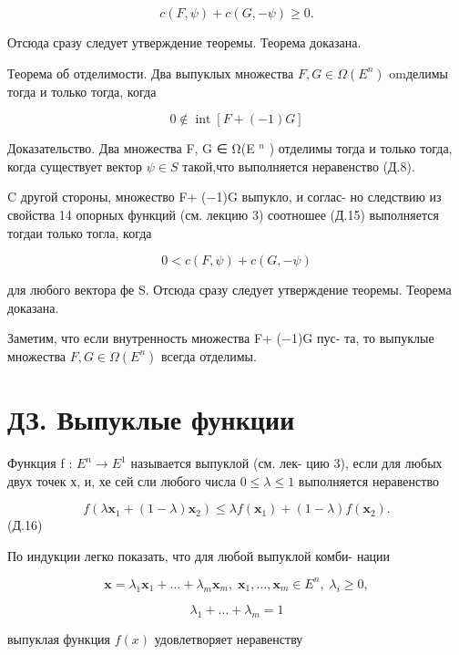 \documentclass[8pt]{extarticle}
\begin{document}
\[
c\left( {F,\psi }\right)  + c\left( {G, - \psi }\right)  \geq  0.
\]

Отсюда сразу следует утверждение теоремы. Теорема доказана.

Теорема об отделимости. Два выпуклых множества \(F,G \in  \Omega \left( {E}^{n}\right)\) omделимы тогда и только тогда, когда

\[
0 \notin  \operatorname{int}\left\lbrack  {F + \left( {-1}\right) G}\right\rbrack \tag{II.15}
\]

Доказательство. Два множества F, G ∈ Ω(E \({}^{n}\) ) отделимы тогда и только тогда, когда существует вектор \(\psi  \in  S\) такой,что выполняется неравенство (Д.8).

C другой стороны, множество F+ (−1)G выпукло, и соглас- но следствию из свойства 14 опорных функций (см. лекцию 3) соотношее (Д.15) выполняется тогдаи только тогла, когда

\[
0 < c\left( {F,\psi }\right)  + c\left( {G, - \psi }\right)
\]

для любого вектора фе S. Отсюда сразу следует утверждение теоремы. Теорема доказана.

Заметим, что если внутренность множества F+ (−1)G пус- та, то выпуклые множества \(F,G \in  \Omega \left( {E}^{n}\right)\) всегда отделимы.

\section*{ДЗ. Выпуклые функции}

Функция f : \({E}^{n} \rightarrow  {E}^{1}\) называется выпуклой (см. лек- цию 3), если для любых двух точек х, и, хе сей сли любого числа \(0 \leq  \lambda  \leq  1\) выполняется неравенство

\[
f\left( {\lambda {\mathbf{x}}_{1} + \left( {1 - \lambda }\right) {\mathbf{x}}_{2}}\right)  \leq  {\lambda f}\left( {\mathbf{x}}_{1}\right)  + \left( {1 - \lambda }\right) f\left( {\mathbf{x}}_{2}\right) .
\]
 (Д.16)

По индукции легко показать, что для любой выпуклой комби- нации

\[
\mathbf{x} = {\lambda }_{1}{\mathbf{x}}_{1} + \ldots  + {\lambda }_{m}{\mathbf{x}}_{m},\;{\mathbf{x}}_{1},\ldots ,{\mathbf{x}}_{m} \in  {E}^{n},\;{\lambda }_{i} \geq  0,
\]

\[
{\lambda }_{1} + \ldots  + {\lambda }_{m} = 1
\]

выпуклая функция \(f\left( x\right)\) удовлетворяет неравенству
\end{document}

